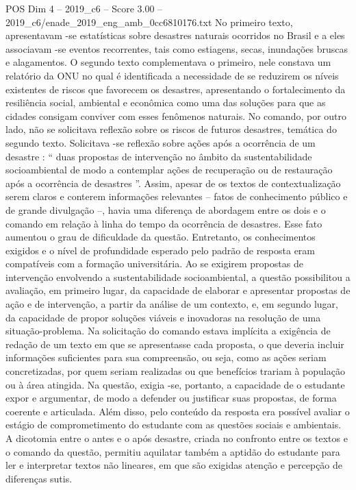 \begin{textsample}{POS Dim 4 – 2019\_c6 – Score 3.00 – 2019\_c6/enade\_2019\_eng\_amb\_0cc6810176.txt}
No primeiro texto, apresentavam -se estatísticas sobre desastres naturais ocorridos no Brasil e a eles associavam -se eventos recorrentes, tais como estiagens, secas, inundações bruscas e alagamentos.
O segundo texto complementava o primeiro, nele constava um relatório da ONU no qual é identificada a necessidade de se reduzirem os níveis existentes de riscos que favorecem os desastres, apresentando o fortalecimento da resiliência social, ambiental e econômica como uma das soluções para que as cidades consigam conviver com esses fenômenos naturais.
No comando, por outro lado, não se solicitava reflexão sobre os riscos de futuros desastres, temática do segundo texto.
Solicitava -se reflexão sobre ações após a ocorrência de um desastre : “ duas propostas de intervenção no âmbito da sustentabilidade socioambiental de modo a contemplar ações de recuperação ou de restauração após a ocorrência de desastres ”.
Assim, apesar de os textos de contextualização serem claros e conterem informações relevantes – fatos de conhecimento público e de grande divulgação –, havia uma diferença de abordagem entre os dois e o comando em relação à linha do tempo da ocorrência de desastres.
Esse fato aumentou o grau de dificuldade da questão.
Entretanto, os conhecimentos exigidos e o nível de profundidade esperado pelo padrão de resposta eram compatíveis com a formação universitária.
Ao se exigirem propostas de intervenção envolvendo a sustentabilidade socioambiental, a questão possibilitou a avaliação, em primeiro lugar, da capacidade de elaborar e apresentar propostas de ação e de intervenção, a partir da análise de um contexto, e, em segundo lugar, da capacidade de propor soluções viáveis e inovadoras na resolução de uma situação-problema.
Na solicitação do comando estava implícita a exigência de redação de um texto em que se apresentasse cada proposta, o que deveria incluir informações suficientes para sua compreensão, ou seja, como as ações seriam concretizadas, por quem seriam realizadas ou que benefícios trariam à população ou à área atingida.
Na questão, exigia -se, portanto, a capacidade de o estudante expor e argumentar, de modo a defender ou justificar suas propostas, de forma coerente e articulada.
Além disso, pelo conteúdo da resposta era possível avaliar o estágio de comprometimento do estudante com as questões sociais e ambientais.
A dicotomia entre o antes e o após desastre, criada no confronto entre os textos e o comando da questão, permitiu aquilatar também a aptidão do estudante para ler e interpretar textos não lineares, em que são exigidas atenção e percepção de diferenças sutis.

\end{textsample}
